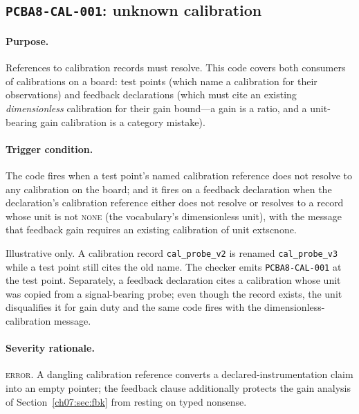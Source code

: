\subsection{\texttt{PCBA8-CAL-001}: unknown calibration}\label{ch07:sub:cal001}

\paragraph{Purpose.} References to calibration records must resolve. This code covers both consumers of calibrations on a board: test points (which name a calibration for their observations) and feedback declarations (which must cite an existing \emph{dimensionless} calibration for their gain bound---a gain is a ratio, and a unit-bearing gain calibration is a category mistake).

\paragraph{Trigger condition.} The code fires when a test point's named calibration reference does not resolve to any calibration on the board; and it fires on a feedback declaration when the declaration's calibration reference either does not resolve or resolves to a record whose unit is not \textsc{none} (the vocabulary's dimensionless unit), with the message that feedback gain requires an existing calibration of unit 	extsc{none}.

\begin{example}\label{ch07:ex:cal001}
Illustrative only. A calibration record \texttt{cal\_probe\_v2} is renamed \texttt{cal\_probe\_v3} while a test point still cites the old name. The checker emits \texttt{PCBA8-CAL-001} at the test point. Separately, a feedback declaration cites a calibration whose unit was copied from a signal-bearing probe; even though the record exists, the unit disqualifies it for gain duty and the same code fires with the dimensionless-calibration message.
\end{example}

\paragraph{Severity rationale.} \textsc{error}. A dangling calibration reference converts a declared-instrumentation claim into an empty pointer; the feedback clause additionally protects the gain analysis of Section~\ref{ch07:sec:fbk} from resting on typed nonsense.

